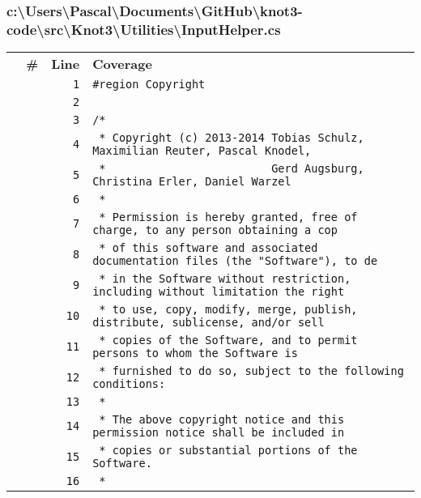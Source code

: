 \documentclass[a4paper,10pt]{article}
\begin{document}
\subsubsection{c:\textbackslash Users\textbackslash Pascal\textbackslash Documents\textbackslash GitHub\textbackslash knot3-code\textbackslash src\textbackslash Knot3\textbackslash Utilities\textbackslash InputHelper.cs}
\begin{longtable}[l]{lrrl}
\textbf{} & \textbf{\#} & \textbf{Line} & \textbf{Coverage}\\
\cellcolor{gray} &  & \verb~1~ & \verb~#region Copyright~\\
\cellcolor{gray} &  & \verb~2~ & \verb~~\\
\cellcolor{gray} &  & \verb~3~ & \verb~/*~\\
\cellcolor{gray} &  & \verb~4~ & \verb~ * Copyright (c) 2013-2014 Tobias Schulz, Maximilian Reuter, Pascal Knodel,~\\
\cellcolor{gray} &  & \verb~5~ & \verb~ *                         Gerd Augsburg, Christina Erler, Daniel Warzel~\\
\cellcolor{gray} &  & \verb~6~ & \verb~ *~\\
\cellcolor{gray} &  & \verb~7~ & \verb~ * Permission is hereby granted, free of charge, to any person obtaining a cop~\\
\cellcolor{gray} &  & \verb~8~ & \verb~ * of this software and associated documentation files (the "Software"), to de~\\
\cellcolor{gray} &  & \verb~9~ & \verb~ * in the Software without restriction, including without limitation the right~\\
\cellcolor{gray} &  & \verb~10~ & \verb~ * to use, copy, modify, merge, publish, distribute, sublicense, and/or sell~\\
\cellcolor{gray} &  & \verb~11~ & \verb~ * copies of the Software, and to permit persons to whom the Software is~\\
\cellcolor{gray} &  & \verb~12~ & \verb~ * furnished to do so, subject to the following conditions:~\\
\cellcolor{gray} &  & \verb~13~ & \verb~ *~\\
\cellcolor{gray} &  & \verb~14~ & \verb~ * The above copyright notice and this permission notice shall be included in ~\\
\cellcolor{gray} &  & \verb~15~ & \verb~ * copies or substantial portions of the Software.~\\
\cellcolor{gray} &  & \verb~16~ & \verb~ *~\\

\end{longtable}
\end{document}
